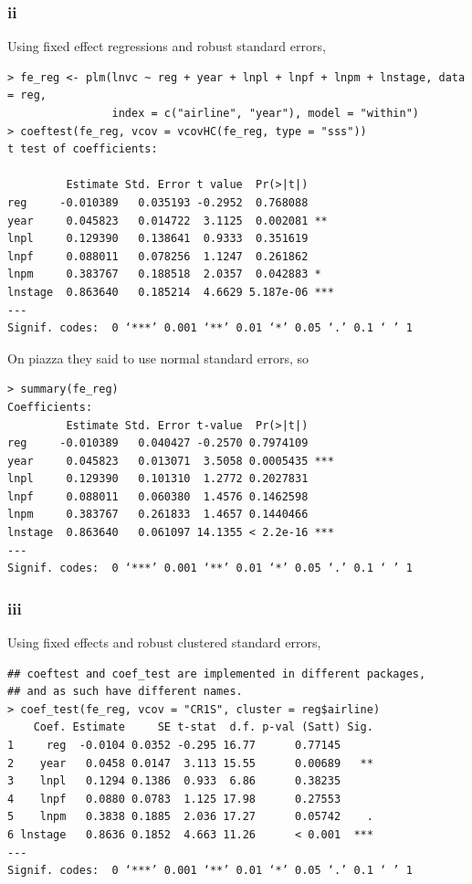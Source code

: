 \documentclass[12pt,letterpaper]{article}
\theoremstyle{definition}
\begin{document}
\subsubsection*{ii}

Using fixed effect regressions and robust standard errors,
\begin{Verbatim}[fontsize=\small]
> fe_reg <- plm(lnvc ~ reg + year + lnpl + lnpf + lnpm + lnstage, data = reg,
                index = c("airline", "year"), model = "within")
> coeftest(fe_reg, vcov = vcovHC(fe_reg, type = "sss"))
t test of coefficients:

         Estimate Std. Error t value  Pr(>|t|)
reg     -0.010389   0.035193 -0.2952  0.768088
year     0.045823   0.014722  3.1125  0.002081 **
lnpl     0.129390   0.138641  0.9333  0.351619
lnpf     0.088011   0.078256  1.1247  0.261862
lnpm     0.383767   0.188518  2.0357  0.042883 *
lnstage  0.863640   0.185214  4.6629 5.187e-06 ***
---
Signif. codes:  0 ‘***’ 0.001 ‘**’ 0.01 ‘*’ 0.05 ‘.’ 0.1 ‘ ’ 1
\end{Verbatim}

On piazza they said to use normal standard errors, so
\begin{Verbatim}[fontsize=\small]
> summary(fe_reg)
Coefficients:
         Estimate Std. Error t-value  Pr(>|t|)
reg     -0.010389   0.040427 -0.2570 0.7974109
year     0.045823   0.013071  3.5058 0.0005435 ***
lnpl     0.129390   0.101310  1.2772 0.2027831
lnpf     0.088011   0.060380  1.4576 0.1462598
lnpm     0.383767   0.261833  1.4657 0.1440466
lnstage  0.863640   0.061097 14.1355 < 2.2e-16 ***
---
Signif. codes:  0 ‘***’ 0.001 ‘**’ 0.01 ‘*’ 0.05 ‘.’ 0.1 ‘ ’ 1
\end{Verbatim}

\subsubsection*{iii}

Using fixed effects and robust clustered standard errors,
\begin{Verbatim}[fontsize=\small]
## coeftest and coef_test are implemented in different packages,
## and as such have different names.
> coef_test(fe_reg, vcov = "CR1S", cluster = reg$airline)
    Coef. Estimate     SE t-stat  d.f. p-val (Satt) Sig.
1     reg  -0.0104 0.0352 -0.295 16.77      0.77145
2    year   0.0458 0.0147  3.113 15.55      0.00689   **
3    lnpl   0.1294 0.1386  0.933  6.86      0.38235
4    lnpf   0.0880 0.0783  1.125 17.98      0.27553
5    lnpm   0.3838 0.1885  2.036 17.27      0.05742    .
6 lnstage   0.8636 0.1852  4.663 11.26      < 0.001  ***
---
Signif. codes:  0 ‘***’ 0.001 ‘**’ 0.01 ‘*’ 0.05 ‘.’ 0.1 ‘ ’ 1
\end{Verbatim}
\end{document}

